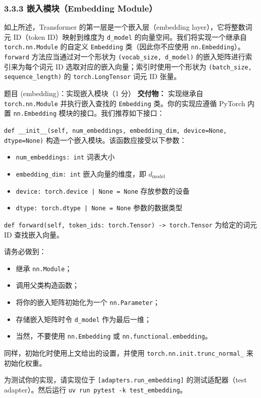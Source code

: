 \subsubsection*{3.3.3 嵌入模块（Embedding Module）}

如上所述，Transformer 的第一层是一个嵌入层（embedding layer），它将整数词元 ID（token ID）映射到维度为 \texttt{d\_model} 的向量空间。我们将实现一个继承自 \texttt{torch.nn.Module} 的自定义 \texttt{Embedding} 类（因此你不应使用 \texttt{nn.Embedding}）。\texttt{forward} 方法应当通过对一个形状为 \texttt{(vocab\_size, d\_model)} 的嵌入矩阵进行索引来为每个词元 ID 选取对应的嵌入向量；索引时使用一个形状为 \texttt{(batch\_size, sequence\_length)} 的 \texttt{torch.LongTensor} 词元 ID 张量。

\begin{problembox}{题目 (embedding)：实现嵌入模块（1 分）}
\textbf{交付物：} 实现继承自 \texttt{torch.nn.Module} 并执行嵌入查找的 \texttt{Embedding} 类。你的实现应遵循 PyTorch 内置 \texttt{nn.Embedding} 模块的接口。我们推荐如下接口：

\medskip
\texttt{def \_\_init\_\_(self, num\_embeddings, embedding\_dim, device=None, dtype=None)} \quad 构造一个嵌入模块。该函数应接受以下参数：
\begin{itemize}[leftmargin=2.2em]
  \item \texttt{num\_embeddings: int} \quad 词表大小
  \item \texttt{embedding\_dim: int} \quad 嵌入向量的维度，即 $d_{\text{model}}$
  \item \texttt{device: torch.device | None = None} \quad 存放参数的设备
  \item \texttt{dtype: torch.dtype | None = None} \quad 参数的数据类型
\end{itemize}

\texttt{def forward(self, token\_ids: torch.Tensor) -> torch.Tensor} \quad 为给定的词元 ID 查找嵌入向量。

\medskip
请务必做到：
\begin{itemize}[leftmargin=2.2em]
  \item 继承 \texttt{nn.Module}；
  \item 调用父类构造函数；
  \item 将你的嵌入矩阵初始化为一个 \texttt{nn.Parameter}；
  \item 存储嵌入矩阵时令 \texttt{d\_model} 作为最后一维；
  \item 当然，不要使用 \texttt{nn.Embedding} 或 \texttt{nn.functional.embedding}。
\end{itemize}

同样，初始化时使用上文给出的设置，并使用 \texttt{torch.nn.init.trunc\_normal\_} 来初始化权重。

为测试你的实现，请实现位于 \texttt{[adapters.run\_embedding]} 的测试适配器（test adapter）。然后运行 \texttt{uv run pytest -k test\_embedding}。
\end{problembox}


